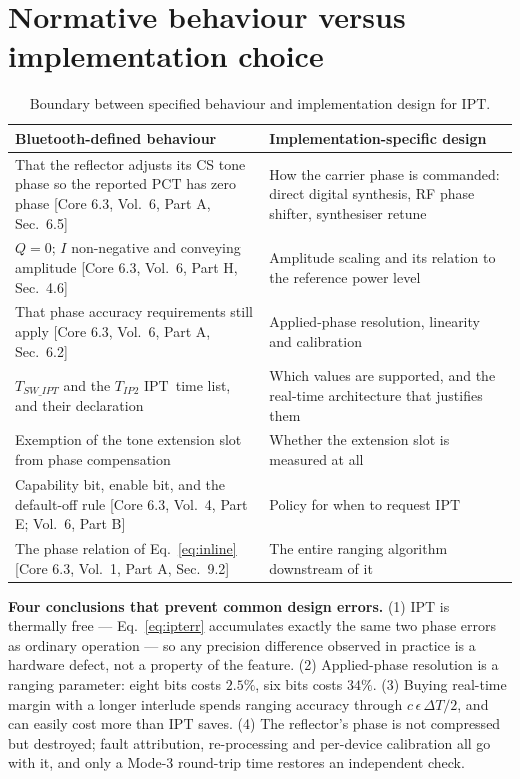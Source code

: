 \documentclass[11pt,a4paper]{article}
\newcommand{\PCT}{\ensuremath{\mathrm{PCT}}}
\newcommand{\IPT}{\ensuremath{\mathrm{IPT}}}
\newcommand{\Tswipt}{T_{SW\_IPT}}
\newcommand{\Tiptwo}{T_{IP2}}
\newcommand{\core}[1]{\textcolor{rulegrey}{\small[Core 6.3, #1]}}
\begin{document}
\section{Normative behaviour versus implementation choice}

\begin{table}[htb]
\caption{Boundary between specified behaviour and implementation design for \IPT.}
\label{tab:normvsimpl}
\centering\small
\begin{tabular}{@{}L{62mm}L{62mm}@{}}
\toprule
Bluetooth-defined behaviour & Implementation-specific design \\
\midrule
That the reflector adjusts its CS tone phase so the reported $\PCT$ has zero phase \core{Vol.\ 6, Part A, Sec.\ 6.5} & How the carrier phase is commanded: direct digital synthesis, RF phase shifter, synthesiser retune \\
$Q = 0$; $I$ non-negative and conveying amplitude \core{Vol.\ 6, Part H, Sec.\ 4.6} & Amplitude scaling and its relation to the reference power level \\
That phase accuracy requirements still apply \core{Vol.\ 6, Part A, Sec.\ 6.2} & Applied-phase resolution, linearity and calibration \\
$\Tswipt$ and the $\Tiptwo$ \IPT\ time list, and their declaration & Which values are supported, and the real-time architecture that justifies them \\
Exemption of the tone extension slot from phase compensation & Whether the extension slot is measured at all \\
Capability bit, enable bit, and the default-off rule \core{Vol.\ 4, Part E; Vol.\ 6, Part B} & Policy for when to request \IPT \\
The phase relation of Eq.~\eqref{eq:inline} \core{Vol.\ 1, Part A, Sec.\ 9.2} & The entire ranging algorithm downstream of it \\
\bottomrule
\end{tabular}
\end{table}

\begin{callout}
\textbf{Four conclusions that prevent common design errors.} (1) \IPT{} is thermally free ---
Eq.~\eqref{eq:ipterr} accumulates exactly the same two phase errors as ordinary operation --- so any
precision difference observed in practice is a hardware defect, not a property of the feature.
(2) Applied-phase resolution is a ranging parameter: eight bits costs $2.5\%$, six bits costs
$34\%$. (3) Buying real-time margin with a longer interlude spends ranging accuracy through
$c\,\epsilon\,\Delta T/2$, and can easily cost more than \IPT{} saves. (4) The reflector's phase is
not compressed but destroyed; fault attribution, re-processing and per-device calibration all go with
it, and only a Mode-3 round-trip time restores an independent check.
\end{callout}
\end{document}

